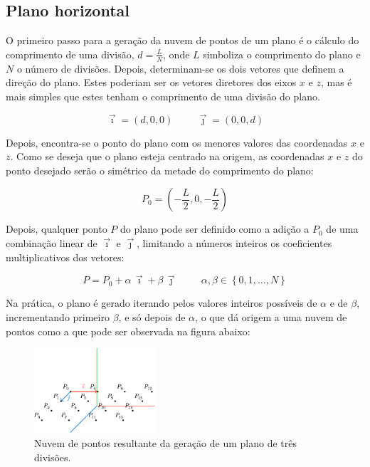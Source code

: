 \documentclass[12pt, a4paper]{article}
\begin{document}
\subsection{Plano horizontal}

O primeiro passo para a geração da nuvem de pontos de um plano é o cálculo do comprimento de uma
divisão, $d = \frac{L}{N}$, onde $L$ simboliza o comprimento do plano e $N$ o número de divisões.
Depois, determinam-se os dois vetores que definem a direção do plano. Estes poderiam ser os vetores
diretores dos eixos $x$ e $z$, mas é mais simples que estes tenham o comprimento de uma divisão do
plano.

$$
\vec{\imath} = (d, 0, 0)
\hspace{1cm}
\vec{\jmath} = (0, 0, d)
$$

Depois, encontra-se o ponto do plano com os menores valores das coordenadas $x$ e $z$. Como se
deseja que o plano esteja centrado na origem, as coordenadas $x$ e $z$ do ponto desejado serão o
simétrico da metade do comprimento do plano:

$$
P_0 = \left ( - \frac{L}{2}, 0, - \frac{L}{2} \right )
$$

Depois, qualquer ponto $P$ do plano pode ser definido como a adição a $P_0$ de uma combinação linear
de $\vec{\imath}$ e $\vec{\jmath}$, limitando a números inteiros os coeficientes multiplicativos dos
vetores:

$$
P = P_0 + \alpha \, \vec{\imath} + \beta \, \vec{\jmath}
\hspace{1cm}
\alpha, \beta \in \left \lbrace 0, 1, \ldots, N \right \rbrace
$$

Na prática, o plano é gerado iterando pelos valores inteiros possíveis de $\alpha$ e de $\beta$,
incrementando primeiro $\beta$, e só depois de $\alpha$, o que dá origem a uma nuvem de pontos como
a que pode ser observada na figura abaixo:

\begin{figure}[H]
    \centering
    \includegraphics[width=0.4\textwidth]{res/figures/PlanePoints.pdf}
    \caption{Nuvem de pontos resultante da geração de um plano de três divisões.}
\end{figure}
\end{document}
